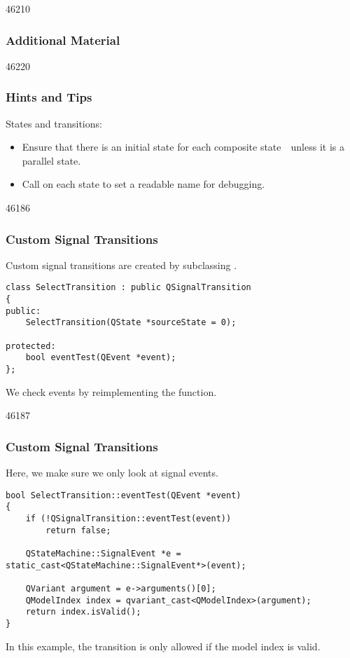 \begin{slide}{46210}\frametitle{Additional Material}

\end{slide}

\begin{slide}{46220}\frametitle{Hints and Tips}

States and transitions:
\begin{itemize}
\item Ensure that there is an initial state for each composite
state~\textemdash~unless it is a parallel state.
\item Call  on each state to set a readable
name for debugging.
\end{itemize}
\end{slide}

\begin{slide}[fragile]{46186}\frametitle{Custom Signal Transitions}

Custom signal transitions are created by subclassing .

\vspace*{-0.5em}
\small
\begin{lstlisting}
class SelectTransition : public QSignalTransition
{
public:
    SelectTransition(QState *sourceState = 0);

protected:
    bool eventTest(QEvent *event);
};
\end{lstlisting}
\normalsize
\vfill
We check events by reimplementing the  function.
\end{slide}

\begin{slide}[fragile]{46187}\frametitle{Custom Signal Transitions}
Here, we make sure we only look at signal events.

\vspace*{-0.5em}
\small
\begin{lstlisting}
bool SelectTransition::eventTest(QEvent *event)
{
    if (!QSignalTransition::eventTest(event))
        return false;

    QStateMachine::SignalEvent *e = static_cast<QStateMachine::SignalEvent*>(event);

    QVariant argument = e->arguments()[0];
    QModelIndex index = qvariant_cast<QModelIndex>(argument);
    return index.isValid();
}
\end{lstlisting}
\normalsize

In this example, the transition is only allowed if the model index is valid.
\end{slide}
